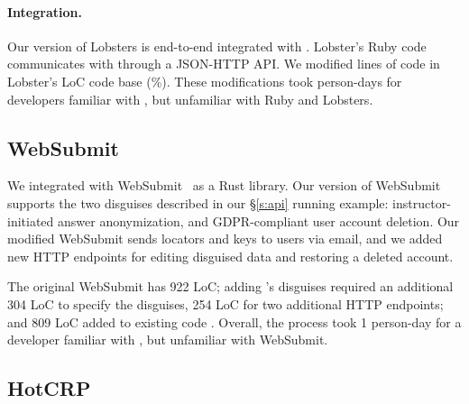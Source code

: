 \paragraph{Integration.}
%
Our version of Lobsters is end-to-end integrated with \sys.
%
Lobster's Ruby code communicates with \sys through a JSON-HTTP API.
%
We modified  lines of code in Lobster's  LoC code base
(\%).
%
These modifications took  person-days for developers familiar with
\sys, but unfamiliar with Ruby and Lobsters.
%


\subsection{WebSubmit}
\label{s:case-websubmit}

%
We integrated \sys with WebSubmit~\cite{websubmit-rs-anon} as a Rust library.
%
Our version of WebSubmit supports the two disguises described in our \S\ref{s:api}
running example: instructor-initiated answer anonymization, and GDPR-compliant
user account deletion.
%
Our modified WebSubmit sends locators and keys to users via email, and we added
new HTTP endpoints for editing disguised data and restoring a deleted account.
%

%
The original WebSubmit has 922 LoC; adding \sys's disguises required an additional 304 LoC
to specify the disguises, 254 LoC for two additional HTTP endpoints; and 809 LoC added to
existing code  .
%
Overall, the process took 1 person-day for a developer familiar with \sys, but
unfamiliar with WebSubmit.
%

\subsection{HotCRP}
\label{s:case-hotcrp}

